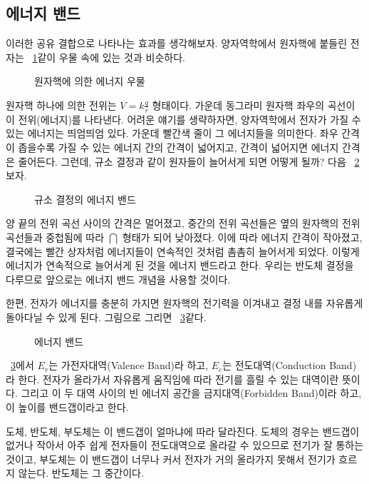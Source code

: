 \subsection{에너지 밴드}
이러한 공유 결합으로 나타나는 효과를 생각해보자. 양자역학에서 원자핵에 붙들린 전자는 \figurename~\ref{fig:atom well}\과 같이 우물 속에 있는 것과 비슷하다.
\begin{figure}[!hbp]
    \centering
    \caption{원자핵에 의한 에너지 우물}\label{fig:atom well}
\end{figure}
원자핵 하나에 의한 전위는 $V=k\frac{q}{r}$ 형태이다. 가운데 동그라미 원자핵 좌우의 곡선이 이 전위(에너지)를 나타낸다.
어려운 얘기를 생략하자면, 양자역학에서 전자가 가질 수 있는 에너지는 띄엄띄엄 있다. 가운데 빨간색 줄이 그 에너지들을 의미한다. 좌우 간격이 좁을수록 가질 수 있는 에너지 간의 간격이 넓어지고, 간격이 넓어지면 에너지 간격은 줄어든다.
그런데, 규소 결정과 같이 원자들이 늘어서게 되면 어떻게 될까? 다음 \figurename~\ref{fig:si crystal energy band}\을 보자.
\begin{figure}[!hbp]
    \centering
    \caption{규소 결정의 에너지 밴드}\label{fig:si crystal energy band}
\end{figure}
양 끝의 전위 곡선 사이의 간격은 멀어졌고, 중간의 전위 곡선들은 옆의 원자핵의 전위 곡선들과 중첩됨에 따라 $\bigcap $ 형태가 되어 낮아졌다. 이에 따라 에너지 간격이 작아졌고, 결국에는 빨간 상자처럼 에너지들이 연속적인 것처럼 촘촘히 늘어서게 되었다.
이렇게 에너지가 연속적으로 늘어서게 된 것을 에너지 밴드라고 한다. 우리는 반도체 결정을 다루므로 앞으로는 에너지 밴드 개념을 사용할 것이다.

한편, 전자가 에너지를 충분히 가지면 원자핵의 전기력을 이겨내고 결정 내를 자유롭게 돌아다닐 수 있게 된다. 그림으로 그리면 \figurename~\ref{fig:energy band}\와 같다.
\begin{figure}[!hbp]
    \centering
    \caption{에너지 밴드}\label{fig:energy band}
\end{figure}
\figurename~\ref{fig:energy band}에서 $E_v$는 가전자대역(Valence Band)라 하고, $E_c$는 전도대역(Conduction Band)라 한다. 전자가 올라가서 자유롭게 움직임에 따라 전기를 흘릴 수 있는 대역이란 뜻이다.
그리고 이 두 대역 사이의 빈 에너지 공간을 금지대역(Forbidden Band)이라 하고, 이 높이를 밴드갭이라고 한다.

도체, 반도체, 부도체는 이 밴드갭이 얼마냐에 따라 달라진다. 도체의 경우는 밴드갭이 없거나 작아서 아주 쉽게 전자들이 전도대역으로 올라갈 수 있으므로 전기가 잘 통하는 것이고, 부도체는 이 밴드갭이 너무나 커서 전자가 거의 올라가지 못해서 전기가 흐르지 않는다. 반도체는 그 중간이다.

